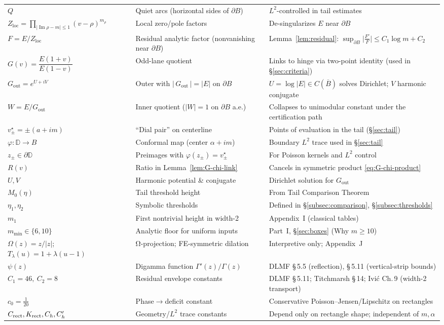 \documentclass[11pt]{article}
\numberwithin{equation}{section}
\theoremstyle{remark}
\newcommand{\D}{\mathbb{D}}
\DeclareMathOperator{\Imag}{Im}
\newcommand{\Gout}{G_{\mathrm{out}}}
\newcommand{\Zloc}{Z_{\mathrm{loc}}}
\begin{document}
\begin{tabularx}{\textwidth}{@{}p{3.2cm} L L@{}}
$Q$ & Quiet arcs (horizontal sides of $\partial B$) & $L^2$-controlled in tail estimates\\[2pt]
$\Zloc=\prod_{|\Imag\rho-m|\le1}(v-\rho)^{m_\rho}$ & Local zero/pole factors & De-singularizes $E$ near $\partial B$\\[2pt]
$F=E/\Zloc$ & Residual analytic factor (nonvanishing near $\partial B$) & Lemma~\ref{lem:residual}: $\sup_{\partial B}\big|\frac{F'}{F}\big|\le C_1\log m+C_2$\\[2pt]
$G(v)=\dfrac{E(1+v)}{E(1-v)}$ & Odd-lane quotient & Links to hinge via two-point identity (used in §\ref{sec:criteria})\\[2pt]
$\Gout=e^{U+iV}$ & Outer with $|\,\Gout\,|=|E|$ on $\partial B$ & $U=\log|E|\in C(\overline B)$ solves Dirichlet; $V$ harmonic conjugate\\[2pt]
$W=E/\Gout$ & Inner quotient ($|W|=1$ on $\partial B$ a.e.) & Collapses to unimodular constant under the certification path\\[2pt]
$v_\pm^\star=\pm(a+im)$ & “Dial pair” on centerline & Points of evaluation in the tail (§\ref{sec:tail})\\[2pt]
$\varphi:\D\to B$ & Conformal map (center $\alpha+im$) & Boundary $L^2$ trace used in §\ref{sec:tail}\\[2pt]
$z_\pm\in\partial\D$ & Preimages with $\varphi(z_\pm)=v_\pm^\star$ & For Poisson kernels and $L^2$ control\\[2pt]
$R(v)$ & Ratio in Lemma~\ref{lem:G-chi-link} & Cancels in symmetric product \eqref{eq:G-chi-product}\\[2pt]
$U,V$ & Harmonic potential \& conjugate & Dirichlet solution for $\Gout$\\[2pt]
$M_0(\eta)$ & Tail threshold height & From Tail Comparison Theorem\\[2pt]
$\eta_1,\eta_2$ & Symbolic thresholds & Defined in \S\ref{subsec:comparison}, \S\ref{subsec:thresholds}\\[2pt]
$m_1$ & First nontrivial height in width-2 & Appendix~I (classical tables)\\[2pt]
$m_{\min}\in\{6,10\}$ & Analytic floor for uniform inputs & Part~I, §\ref{sec:boxes} (Why $m\ge10$)\\[2pt]
$\Omega(z)=z/|z|$; $T_\lambda(u)=1+\lambda(u-1)$ & Ω-projection; FE-symmetric dilation & Interpretive only; Appendix~J\\[2pt]
$\psi(z)$ & Digamma function $\Gamma'(z)/\Gamma(z)$ & DLMF §\,5.5 (reflection), §\,5.11 (vertical-strip bounds)\\[2pt]
$C_1=46,\ C_2=8$ & Residual envelope constants & DLMF §\,5.11; Titchmarsh §\,14; Ivi\'c Ch.\,9 (width-2 transport)\\[2pt]
$c_0=\tfrac1{20}$ & Phase$\to$deficit constant & Conservative Poisson--Jensen/Lipschitz on rectangles\\[2pt]
$C_{\rm rect},K_{\rm rect},C_h,C_h'$ & Geometry/$L^2$ trace constants & Depend only on rectangle shape; independent of $m,\alpha$\\
\bottomrule
\end{tabularx}
\end{document}
